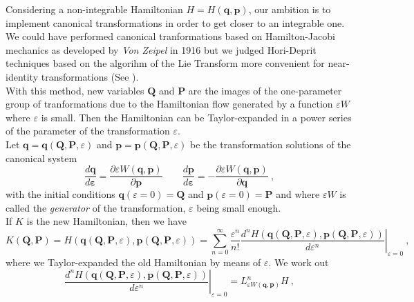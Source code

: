 \documentclass[a4paper]{article}
\begin{document}
\label{lie}

Considering a non-integrable Hamiltonian $H=H(\mathbf q, \mathbf p )$, our ambition is to implement canonical transformations in order to get closer to an integrable one.
We could have performed canonical tranformations based on Hamilton-Jacobi mechanics as developed by \textit{Von Zeipel} in 1916 but we judged Hori-Deprit techniques based on the algorihm of the Lie Transform more convenient for near-identity transformations (See \cite{Boccaletti2}). \\
With this method, new variables $\mathbf Q$ and $\mathbf P$ are the images of the one-parameter group of tranformations due to the Hamiltonian flow generated by a function $\varepsilon W$ where $\varepsilon$ is small. Then the Hamiltonian can be Taylor-expanded in a power series of the parameter of the transformation $\varepsilon$.  \\
Let $\mathbf q=\mathbf q(\mathbf Q, \mathbf P, \varepsilon)$ and $\mathbf p=\mathbf p(\mathbf Q, \mathbf P, \varepsilon)$ be the transformation solutions of the canonical system 
\begin{equation}
\frac{d \mathbf q }{d \mathbf \varepsilon}=\frac{\partial \varepsilon W(\mathbf q, \mathbf p)}{\partial \mathbf p} \qquad
\frac{d \mathbf p }{d \mathbf \varepsilon}=-\frac{\partial \varepsilon W(\mathbf q, \mathbf p)}{\partial \mathbf q} \ ,
\end{equation}
with the initial conditions $\mathbf q(\varepsilon=0)=\mathbf Q$ and $\mathbf p(\varepsilon=0)=\mathbf P$ and where $\varepsilon W$ is called the \textit{generator} of the transformation, $\varepsilon$ being small enough. \\
If $K$ is the new Hamiltonian, then we have 
\begin{equation}
K(\mathbf Q, \mathbf P )=H(\mathbf q(\mathbf Q, \mathbf P, \varepsilon), \mathbf p(\mathbf Q, \mathbf P, \varepsilon) )=\sum_{n=0}^{\infty} \frac{\varepsilon^{n}}{n!} \left. \frac{ d^{n}H(\mathbf q(\mathbf Q, \mathbf P, \varepsilon), \mathbf p(\mathbf Q, \mathbf P, \varepsilon) )}{d \varepsilon^{n}} \right|_{\varepsilon=0} \ ,
\end{equation}
where we Taylor-expanded the old Hamiltonian by means of $\varepsilon$.
We work out 
\begin{equation}
\left. \frac{ d^{n}H(\mathbf q(\mathbf Q, \mathbf P, \varepsilon), \mathbf p(\mathbf Q, \mathbf P, \varepsilon) )}{d \varepsilon^{n}} \right|_{\varepsilon=0}=L^{n}_{\varepsilon W(\mathbf q, \mathbf p)}H \ ,
\end{equation}
\end{document}
